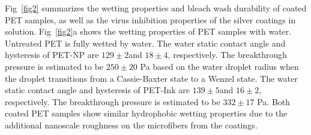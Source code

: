 \documentclass[10pt,letterpaper]{article}
\begin{document}


Fig~\ref{fig2} summarizes the wetting  properties and bleach wash durability of coated PET samples, as well as the virus inhibition properties of the silver coatings in solution.
Fig~\ref{fig2}a shows the wetting properties of PET samples with water. 
Untreated PET is fully wetted by water. The water static contact angle and hysteresis of PET-NP are $129 \pm 2$\degree and $18 \pm 4$\degree, respectively. 
The breakthrough pressure is estimated to be 
$250 \pm 20$ Pa based on the water droplet radius when the droplet transitions from a Cassie-Baxter state to a Wenzel state.  
The water static contact angle and hysteresis of PET-Ink are $139 \pm 5$\degree and $16 \pm 2$\degree, respectively. The breakthrough pressure is estimated to be $332 \pm 17$ Pa. 
Both coated PET samples show similar hydrophobic wetting properties due to the additional nanoscale roughness on the microfibers from the coatings. %
\end{document}
